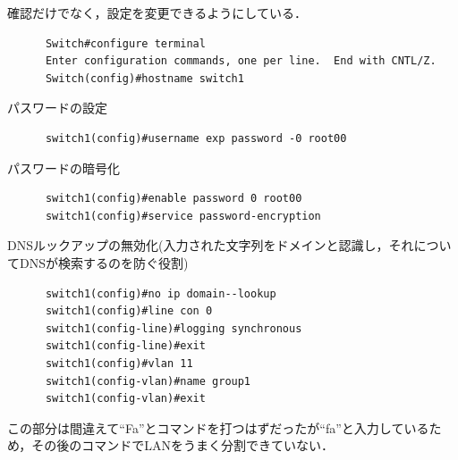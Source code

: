\documentclass{jlreq}
\begin{document}
      確認だけでなく，設定を変更できるようにしている．
      \begin{lstlisting}
      Switch#configure terminal 
      Enter configuration commands, one per line.  End with CNTL/Z.
      Switch(config)#hostname switch1
      \end{lstlisting}
      パスワードの設定
      \begin{lstlisting}
      switch1(config)#username exp password -0 root00
      \end{lstlisting}
      パスワードの暗号化
      \begin{lstlisting}
      switch1(config)#enable password 0 root00
      switch1(config)#service password-encryption
      \end{lstlisting}
      DNSルックアップの無効化(入力された文字列をドメインと認識し，それについてDNSが検索するのを防ぐ役割)\cite{computer_network}
      \begin{lstlisting}
      switch1(config)#no ip domain--lookup
      switch1(config)#line con 0
      switch1(config-line)#logging synchronous
      switch1(config-line)#exit
      switch1(config)#vlan 11
      switch1(config-vlan)#name group1
      switch1(config-vlan)#exit
      \end{lstlisting}
      この部分は間違えて``Fa''とコマンドを打つはずだったが``fa''と入力しているため，その後のコマンドでLANをうまく分割できていない．
\end{document}
